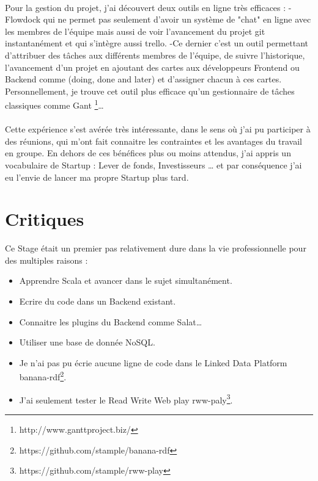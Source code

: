 \documentclass[11pt]{article} %
\begin{document}
\paragraph{}
Pour la gestion du projet, j'ai découvert deux outils en ligne très efficaces :\newline
-Flowdock qui ne permet pas seulement d'avoir un système de "chat" en ligne avec les membres de l'équipe mais aussi de voir l'avancement du projet git instantanément et qui s'intègre aussi trello.
\newline
-Ce dernier c'est un outil permettant d'attribuer des tâches aux différents membres de l'équipe, de suivre l'historique, l'avancement d'un projet en ajoutant des cartes aux développeurs Frontend ou Backend comme (doing, done and later) et d'assigner chacun à ces cartes.
Personnellement, je trouve cet outil plus efficace qu'un gestionnaire de tâches classiques comme Gant \footnote{http://www.ganttproject.biz/}…
\paragraph{}
Cette expérience s’est avérée très intéressante, dans le sens où j’ai pu participer à des réunions, qui m’ont fait connaitre les contraintes et les avantages du travail en groupe.
En dehors de ces bénéfices plus ou moins attendus, j'ai appris un vocabulaire de Startup : Lever de fonds, Investisseurs … et par conséquence j'ai eu l'envie de lancer ma propre Startup plus tard.
\section{Critiques}

Ce Stage était un premier pas relativement dure dans la vie professionnelle pour des multiples raisons :
\begin{itemize}
\item Apprendre Scala et avancer dans le sujet simultanément.

\item Ecrire du code dans un Backend existant.

\item Connaitre les plugins du Backend comme Salat…

\item Utiliser une base de donnée NoSQL.

\item Je n'ai pas pu écrie aucune ligne de code dans le Linked Data Platform banana-rdf\footnote{https://github.com/stample/banana-rdf}.

\item J'ai seulement tester le Read Write Web play rww-paly\footnote{https://github.com/stample/rww-play}.



\end{itemize}
\end{document}
